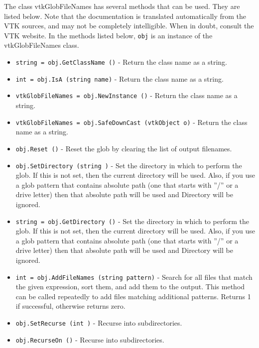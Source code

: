 The class vtkGlobFileNames has several methods that can be used.
  They are listed below.
Note that the documentation is translated automatically from the VTK sources,
and may not be completely intelligible.  When in doubt, consult the VTK website.
In the methods listed below, \verb|obj| is an instance of the vtkGlobFileNames class.
\begin{itemize}
\item  \verb|string = obj.GetClassName ()| -  Return the class name as a string.

\item  \verb|int = obj.IsA (string name)| -  Return the class name as a string.

\item  \verb|vtkGlobFileNames = obj.NewInstance ()| -  Return the class name as a string.

\item  \verb|vtkGlobFileNames = obj.SafeDownCast (vtkObject o)| -  Return the class name as a string.

\item  \verb|obj.Reset ()| -  Reset the glob by clearing the list of output filenames.

\item  \verb|obj.SetDirectory (string )| -  Set the directory in which to perform the glob.  If this is
 not set, then the current directory will be used.  Also, if
 you use a glob pattern that contains absolute path (one that
 starts with ''/'' or a drive letter) then that absolute path
 will be used and Directory will be ignored.

\item  \verb|string = obj.GetDirectory ()| -  Set the directory in which to perform the glob.  If this is
 not set, then the current directory will be used.  Also, if
 you use a glob pattern that contains absolute path (one that
 starts with ''/'' or a drive letter) then that absolute path
 will be used and Directory will be ignored.

\item  \verb|int = obj.AddFileNames (string pattern)| -  Search for all files that match the given expression,
 sort them, and add them to the output.  This method can
 be called repeatedly to add files matching additional patterns.
 Returns 1 if successful, otherwise returns zero.

\item  \verb|obj.SetRecurse (int )| -  Recurse into subdirectories.

\item  \verb|obj.RecurseOn ()| -  Recurse into subdirectories.


\end{itemize}
